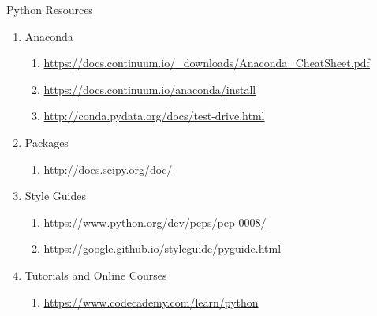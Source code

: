 \documentclass{article}
\begin{document}
\begin{center}
	Python Resources
\end{center}

\begin{enumerate}
	\item Anaconda
	\begin{enumerate}
		\item \url{https://docs.continuum.io/_downloads/Anaconda_CheatSheet.pdf}

		\item \url{https://docs.continuum.io/anaconda/install}

		\item \url{http://conda.pydata.org/docs/test-drive.html}

	\end{enumerate}

	\item Packages
	\begin{enumerate}
		\item \url{http://docs.scipy.org/doc/}
	\end{enumerate}

	\item Style Guides
	\begin{enumerate}
		\item \url{https://www.python.org/dev/peps/pep-0008/}

		\item \url{https://google.github.io/styleguide/pyguide.html}
	\end{enumerate}

	\item Tutorials and Online Courses
	\begin{enumerate}
		\item \url{https://www.codecademy.com/learn/python}
	\end{enumerate}
\end{enumerate}
\end{document}
